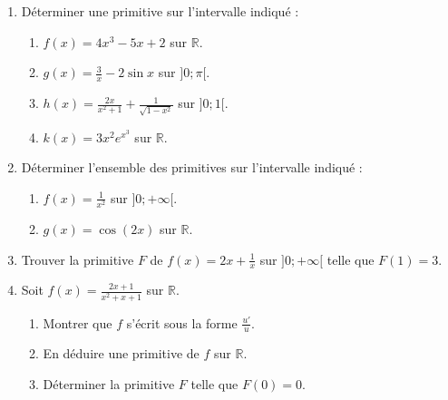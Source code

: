 \documentclass[11pt]{article}
\begin{document}
\begin{exercice}
\begin{enumerate}
  \item Déterminer une primitive sur l'intervalle indiqué :
  \begin{enumerate}
    \item $f(x) = 4x^3 - 5x + 2$ sur $\mathbb{R}$.
    \item $g(x) = \frac{3}{x} - 2\sin x$ sur $]0;\pi[$.
    \item $h(x) = \frac{2x}{x^2+1} + \frac{1}{\sqrt{1-x^2}}$ sur $]0;1[$.
    \item $k(x) = 3x^2 e^{x^3}$ sur $\mathbb{R}$.
  \end{enumerate}
  
  \item Déterminer l'ensemble des primitives sur l'intervalle indiqué :
  \begin{enumerate}
    \item $f(x) = \frac{1}{x^2}$ sur $]0;+\infty[$.
    \item $g(x) = \cos(2x)$ sur $\mathbb{R}$.
  \end{enumerate}
  
  \item Trouver la primitive $F$ de $f(x) = 2x + \frac{1}{x}$ sur $]0;+\infty[$ telle que $F(1) = 3$.
  
  \item Soit $f(x) = \frac{2x+1}{x^2+x+1}$ sur $\mathbb{R}$.
  \begin{enumerate}
    \item Montrer que $f$ s'écrit sous la forme $\frac{u'}{u}$.
    \item En déduire une primitive de $f$ sur $\mathbb{R}$.
    \item Déterminer la primitive $F$ telle que $F(0) = 0$.
  \end{enumerate}
\end{enumerate}
\end{exercice}
\end{document}
